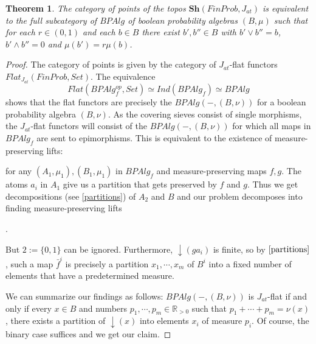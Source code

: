 \documentclass[a4paper]{amsproc}
\theoremstyle{plain}
\newtheorem{theorem}{Theorem}[section]
\theoremstyle{definition}
\theoremstyle{remark}
\numberwithin{equation}{section}
\begin{document}
\begin{theorem} The category of points of the topos $\textbf{Sh}(FinProb,J_{at})$ is equivalent to the full subcategory of $BPAlg$ of boolean probability algebras $(B,\mu)$ such that for each $r\in (0,1)$ and each $b\in B$ there exist $b', b''\in B$ with $b'\vee b''=b$, $b'\wedge b''=0$ and $\mu(b')=r\mu(b)$.\end{theorem}
\begin{proof} The category of points is given by the category of $J_{at}$-flat functors $Flat_{J_{at}}(FinProb, Set)$.  The equivalence 
\[
Flat(BPAlg_f^{op}, Set) \simeq Ind(BPAlg_f) \simeq BPAlg
\]
shows that the flat functors are precisely the $BPAlg(-,(B,\nu))$ for a boolean probability algebra $(B,\nu)$. As the covering sieves consist of single morphisms, the $J_{at}$-flat functors will consist of the $BPAlg(-,(B,\nu))$ for which all maps in $BPAlg_f$ are sent to epimorphisms. This is equivalent to the existence of measure-preserving lifts:
\begin{center}
\end{center}
for any $(A_1,\mu_1), (B_1,\mu_1)$ in $BPAlg_f$ and measure-preserving maps $f,g$. The atoms $a_i$ in $A_1$ give us a partition that gets preserved by $f$ and $g$. Thus we get decompositions (see \ref{partitions}) of $A_2$ and $B$ and our problem decomposes into finding measure-preserving lifts

\begin{center}
.
\end{center}
But $2 := \{0, 1\}$ can be ignored. Furthermore, $\downarrow(g a_i)$ is finite, so by $\ref{partitions}$, such a map $\bar{f}^i$ is precisely a partition $x_1, \cdots, x_m$ of $B^i$ into a fixed number of elements that have a predetermined measure.

We can summarize our findings as follows: $BPAlg(-, (B,\nu))$ is $J_{at}$-flat if and only if every $x \in B$ and numbers $p_1, \cdots, p_m \in \mathbb{R}_{>0}$ such that $p_1 + \cdots + p_m = \nu(x)$, there exists a partition of $\downarrow(x)$ into elements $x_i$ of measure $p_i$. Of course, the binary case suffices and we get our claim.
\end{proof}
\end{document}
